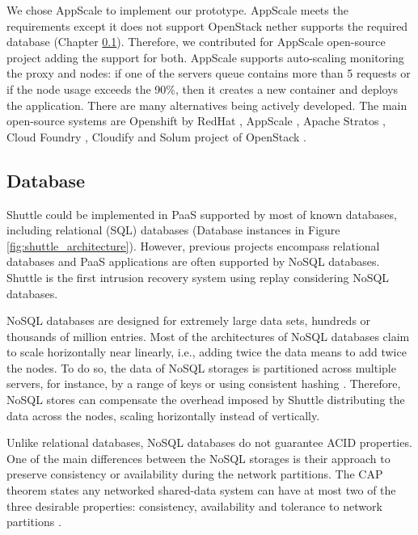 We chose AppScale \cite{Appscale} to implement our prototype. AppScale meets the requirements except it does not support OpenStack nether supports the required database (Chapter \ref{sec:impl:database_options}).  Therefore, we contributed for AppScale open-source project adding the support for both. AppScale supports auto-scaling monitoring the proxy and nodes: if one of the servers queue contains more than 5 requests or if the node usage exceeds the 90\%, then it creates a new container and deploys the application. There are many alternatives being actively developed. The main open-source systems are Openshift by RedHat \cite{OpenShift}, AppScale \cite{Appscale}, Apache Stratos \cite{ApacheStratos}, Cloud Foundry \cite{Cloudfoundry}, Cloudify \cite{cloudify} and Solum project of OpenStack \cite{solum}.  


\subsection{Database}\label{sec:impl:database_options}
Shuttle could be implemented in \ac{PaaS} supported by most of known databases, including relational (\ac{SQL}) databases (Database instances in Figure \ref{fig:shuttle_architecture}). However, previous projects encompass relational databases \cite{warp,goel} and \ac{PaaS} applications are often supported by \acs{NoSQL} databases. Shuttle is the first intrusion recovery system using replay considering \acs{NoSQL} databases.

\acs{NoSQL} databases are designed for extremely large data sets, hundreds or thousands of million entries. Most of the architectures of \acs{NoSQL} databases claim to scale horizontally near linearly, i.e., adding twice the data means to add twice the nodes. To do so, the data of \acs{NoSQL} storages is partitioned across multiple servers, for instance, by a range of keys or using consistent hashing \cite{Chang2008}. Therefore, \acs{NoSQL} stores can compensate the overhead imposed by Shuttle distributing the data across the nodes, scaling horizontally instead of vertically. 


Unlike relational databases, \acs{NoSQL} databases do not guarantee \ac{ACID} properties. One of the main differences between the \acs{NoSQL} storages is their approach to preserve consistency or availability during the network partitions. The \acs{CAP} theorem states any networked shared-data system can have at most two of the three desirable properties: consistency, availability and tolerance to network partitions \cite{brewer2012cap}.

